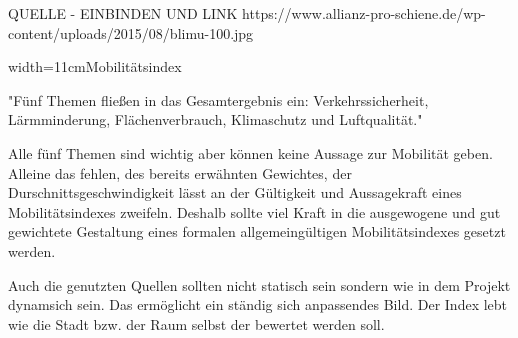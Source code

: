 QUELLE - EINBINDEN UND LINK
https://www.allianz-pro-schiene.de/wp-content/uploads/2015/08/blimu-100.jpg

​​​​{​​​​width=11cm}​​​​{​​​​Mobilitätsindex}​​​​

"Fünf Themen fließen in das Gesamtergebnis ein: Verkehrssicherheit, Lärmminderung, Flächenverbrauch, Klimaschutz und Luftqualität."

Alle fünf Themen sind wichtig aber können keine Aussage zur Mobilität geben. Alleine das fehlen, des bereits erwähnten Gewichtes, der Durschnittsgeschwindigkeit lässt an der Gültigkeit und Aussagekraft eines Mobilitätsindexes zweifeln.
Deshalb sollte viel Kraft in die ausgewogene und gut gewichtete Gestaltung eines formalen allgemeingültigen Mobilitätsindexes gesetzt werden.

Auch die genutzten Quellen sollten nicht statisch sein sondern wie in dem Projekt dynamsich sein. Das ermöglicht ein ständig sich anpassendes Bild. Der Index lebt wie die Stadt bzw. der Raum selbst der bewertet werden soll.
